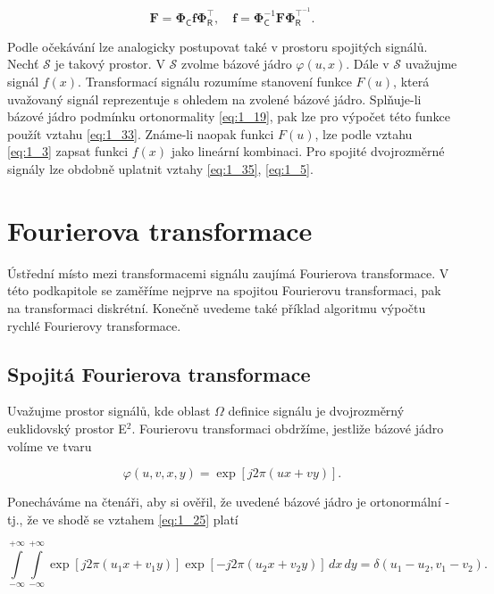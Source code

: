 \begin{equation} \label{eq:2_12-13}
    \mathbf{F} = \mathbf{\Phi}_\mathsf{C} \mathbf{f} \mathbf{\Phi}_{\mathsf{R}}^{\top}, \quad \mathbf{f} = \mathbf{\Phi}_\mathsf{C}^{-1} \mathbf{F} \mathbf{\Phi}_{\mathsf{R}}^{\top^{-1}}.
\end{equation}

Podle očekávání lze analogicky postupovat také v prostoru spojitých signálů. Nechť $\mathscr{S}$ je takový prostor. V $\mathscr{S}$ zvolme bázové jádro $\varphi(u,x)$. Dále v $\mathscr{S}$ uvažujme signál $f(x)$. Transformací signálu rozumíme stanovení funkce $F(u)$, která uvažovaný signál reprezentuje s ohledem na zvolené bázové jádro. Splňuje-li bázové jádro podmínku ortonormality \eqref{eq:1_19}, pak lze pro výpočet této funkce použít vztahu \eqref{eq:1_33}. Známe-li naopak funkci $F(u)$, lze podle vztahu \eqref{eq:1_3} zapsat funkci $f(x)$ jako lineární kombinaci. Pro spojité dvojrozměrné signály lze obdobně uplatnit vztahy \eqref{eq:1_35}, \eqref{eq:1_5}.

\section*{Fourierova transformace}

Ústřední místo mezi transformacemi signálu zaujímá Fourierova transformace. V této podkapitole se zaměříme nejprve na spojitou Fourierovu transformaci, pak na transformaci diskrétní. Konečně uvedeme také příklad algoritmu výpočtu rychlé Fourierovy transformace.

\subsection*{Spojitá Fourierova transformace}

Uvažujme prostor signálů, kde oblast $\Omega$ definice signálu je dvojrozměrný euklidovský prostor E$^2$. Fourierovu transformaci obdržíme, jestliže bázové jádro volíme ve tvaru

\begin{equation} \label{eq:2_14}
    \varphi(u, v, x, y) = \exp \left[ j 2 \pi (ux + vy) \right].
\end{equation}

Ponecháváme na čtenáři, aby si ověřil, že uvedené bázové jádro je ortonormální - tj., že ve shodě se vztahem \eqref{eq:1_25} platí

\begin{equation} \label{eq:2_15}
    \int\limits_{-\infty}^{+\infty} \int\limits_{-\infty}^{+\infty} \exp \left[ j 2 \pi ( u_1 x + v_1 y ) \right] \exp \left[ - j 2 \pi ( u_2 x + v_2 y ) \right]\,dx\,dy = \delta(u_1 - u_2, v_1 - v_2).
\end{equation}

